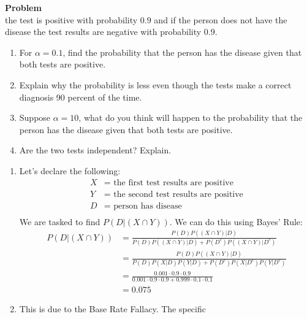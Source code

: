 \documentclass[12pt]{article}
\newenvironment{Ex}{\textbf{Problem}\vspace{.75em}\\}{}
\begin{document}
\begin{enumerate}
\begin{Ex}
    the test is positive with probability $0.9$ and if the person does
    not have the disease the test results are negative with
    probability $0.9$.
    \begin{enumerate}
    \item For $\alpha = 0.1$, find the probability that the person
      has the disease given that both tests are positive.
    \item Explain why the probability is less even though the tests
      make a correct diagnosis 90 percent of the time.
    \item Suppose $\alpha = 10$, what do you think will happen to the
      probability that the person has the disease given that both
      tests are positive.
    \item Are the two tests independent? Explain.
    \end{enumerate}
    \begin{solution} \hfill
      \begin{enumerate}
      \item Let's declare the following:
        \begin{equation}
          \label{eq:3-var-declaration}
          \begin{aligned}
            X &= \text{ the first test results are positive} \\
            Y &= \text{ the second test results are positive} \\
            D &= \text{ person has disease} \\
          \end{aligned}
        \end{equation}
        We are tasked to find $P(D | (X \cap Y))$. We can do this
        using Bayes' Rule:
        \begin{equation}
          \label{eq:4-enumeration}
          \begin{aligned}
            P(D|(X \cap Y)) &= \frac{P(D)P((X \cap Y) | D)}
            {P(D)P((X \cap Y)|D) + P(D^c)P((X \cap Y)|D^c)} \\
            &= \frac{P(D)P((X \cap Y) | D)}
            {P(D)P(X|D)P(Y|D) + P(D^c)P(X|D^c)P(Y|D^c)} \\
            &= \frac{0.001 \cdot 0.9 \cdot 0.9}
            {0.001 \cdot 0.9 \cdot 0.9 + 0.999 \cdot 0.1 \cdot 0.1} \\
            &= 0.075
          \end{aligned}
        \end{equation}
      \item This is due to the Base Rate Fallacy. The specific

\end{enumerate}
\end{solution}
\end{Ex}
\end{enumerate}
\end{document}
